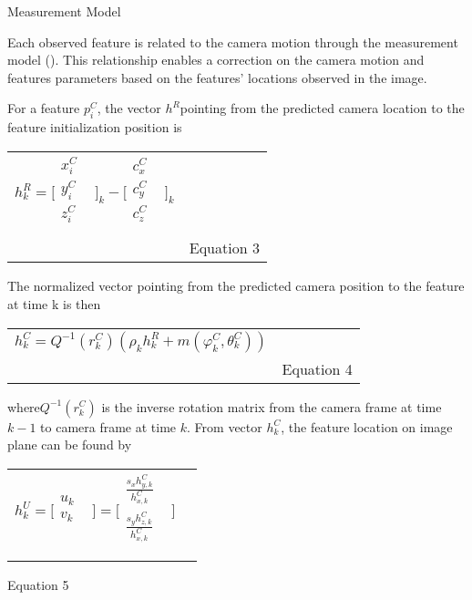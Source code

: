 Measurement Model

Each observed feature is related to the camera motion through the 
measurement model (). This relationship enables a correction on the 
camera motion and features parameters based on the features' locations 
observed in the image. 

For a feature $p_{i}^{C}$, the vector $h^{R}$pointing from the 
predicted camera location to the feature initialization position is 

\begin{table}[h]
\centering
\begin{tabular}{|l|l|}
\hline
$h_{k}^{R}=\lbrack \begin{matrix}
x_{i}^{C} & \\
y_{i}^{C} & \\
z_{i}^{C} & \\
\end{matrix}
\rbrack _{k}-\lbrack \begin{matrix}
c_{x}^{C} & \\
c_{y}^{C} & \\
c_{z}^{C} & \\
\end{matrix}
\rbrack _{k}$\\
 & Equation 3 \\
\hline
\end{tabular}
\end{table}
The normalized vector pointing from the predicted camera position to the 
feature at time k is then 

\begin{table}[h]
\centering
\begin{tabular}{|l|l|}
\hline
$h_{ k}^{C}=Q^{-1}(r_{k}^{C})(\rho _{k}h_{k}^{R}+m(\varphi _{ 
k}^{C},\theta _{k}^{C}))$\\
 & Equation 4 \\
\hline
\end{tabular}
\end{table}
where$Q^{-1}(r_{k}^{C})$ is the inverse rotation matrix from the 
camera frame at time $k-1$ to camera frame at time $k$. From vector 
$h_{ k}^{C}$, the feature location on image plane can be found by

\begin{table}[h]
\centering
\begin{tabular}{|l|l|}
\hline
$h_{k}^{U}= \lbrack \begin{matrix}
u_{k} & \\
v_{k} & \\
\end{matrix}
\rbrack =\lbrack \begin{matrix}
\frac{s_{x}h_{y,k}^{C}}{h_{x,k}^{C}} & \\
\frac{s_{y}h_{z,k}^{C}}{h_{x,k}^{C}} & \\
\end{matrix}
\rbrack $\\
 & \\
\hline
\end{tabular}
\end{table}
Equation 5

